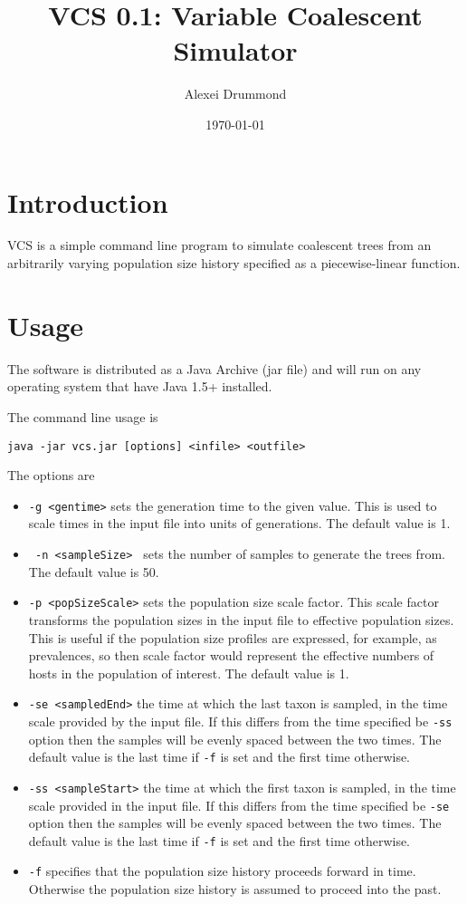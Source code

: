 \documentclass[12pt]{article}
\begin{document}
\title{VCS 0.1: Variable Coalescent Simulator}
\author{Alexei Drummond}
\date{\today{}}
\maketitle

\section*{Introduction}

VCS is a simple command line program to simulate coalescent trees from an arbitrarily varying population size history specified as a piecewise-linear function.

\section*{Usage}

The software is distributed as a Java Archive (jar file) and will run on any operating system that have Java 1.5+ installed.

The command line usage is

\begin{verbatim}
java -jar vcs.jar [options] <infile> <outfile>
\end{verbatim}

The options are

\begin{itemize}
 \item \texttt{-g <gentime>}  sets the generation time to the given value. This is used to scale times in the input file into units of generations. The default value is 1.
 \item \texttt{ -n <sampleSize> } sets the number of samples to generate the trees from. The default value is 50.
\item \texttt{-p <popSizeScale>}   sets the population size scale factor. This scale factor transforms the population sizes in the input  file to effective population sizes. This is useful if the population size profiles are expressed, for example, as prevalences, so then scale factor would represent the effective numbers of hosts in the population of interest. The default value is 1.
 \item \texttt{-se <sampledEnd>}  the time at which the last taxon is sampled, in the time scale provided by the input file. If this differs from the time specified be \texttt{-ss} option then the samples will be evenly spaced between the two times. The default value is the last time if \texttt{-f} is set and the first time otherwise.
\item \texttt{-ss <sampleStart>}  the time at which the first taxon is sampled, in the time scale provided in the input file. If this differs from the time specified be \texttt{-se} option then the samples will be evenly spaced between the two times. The default value is the last time if \texttt{-f} is set and the first time otherwise.
\item \texttt{-f} specifies that the population size history proceeds forward in time. Otherwise the population size history is assumed to proceed into the past.
\end{itemize}
\end{document}
